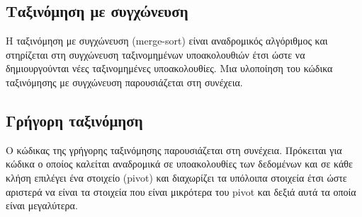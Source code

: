 



\subsection{Ταξινόμηση με συγχώνευση}
Η ταξινόμηση με συγχώνευση (merge-sort) είναι αναδρομικός αλγόριθμος και στηρίζεται στη συγχώνευση ταξινομημένων υποακολουθιών έτσι ώστε να δημιουργούνται νέες ταξινομημένες υποακολουθίες. Μια υλοποίηση του κώδικα ταξινόμησης με συγχώνευση παρουσιάζεται στη συνέχεια. 







\subsection{Γρήγορη ταξινόμηση}
Ο κώδικας της γρήγορης ταξινόμησης  παρουσιάζεται στη συνέχεια. Πρόκειται για κώδικα ο οποίος καλείται αναδρομικά σε υποακολουθίες των δεδομένων και σε κάθε κλήση επιλέγει ένα στοιχείο (pivot) και διαχωρίζει τα υπόλοιπα στοιχεία έτσι ώστε αριστερά να είναι τα στοιχεία που είναι μικρότερα του pivot και δεξιά αυτά τα οποία είναι μεγαλύτερα. 








